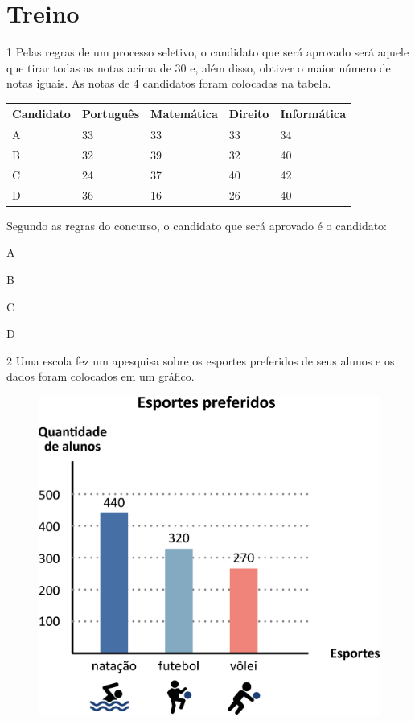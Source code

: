 \begin{mdframed}[linewidth=2pt,linecolor=salmao]
\vspace{6.5cm}
\end{mdframed}

\section*{Treino}

\num{1} Pelas regras de um processo seletivo, o candidato que será aprovado será
aquele que tirar todas as notas acima de 30 e, além disso, obtiver o maior
número de notas iguais. As notas de 4 candidatos foram colocadas na
tabela.

\begin{longtable}[]{@{}lllll@{}}
\toprule
Candidato & Português & Matemática & Direito &
Informática\tabularnewline
\midrule
\endhead
A & 33 & 33 & 33 & 34\tabularnewline
B & 32 & 39 & 32 & 40\tabularnewline
C & 24 & 37 & 40 & 42\tabularnewline
D & 36 & 16 & 26 & 40\tabularnewline
\bottomrule
\end{longtable}

Segundo as regras do concurso, o candidato que será aprovado é o
candidato:

\begin{escolha}
\item
  A
\item
  B
\item
  C
\item
  D
\end{escolha}

\num{2} Uma escola fez um apesquisa sobre os esportes preferidos de seus alunos
e os dados foram colocados em um gráfico.

\pagebreak
\begin{figure}[htpb!]
\centering
\includegraphics[width=.6\textwidth]{./media/image90.png}
\end{figure}


